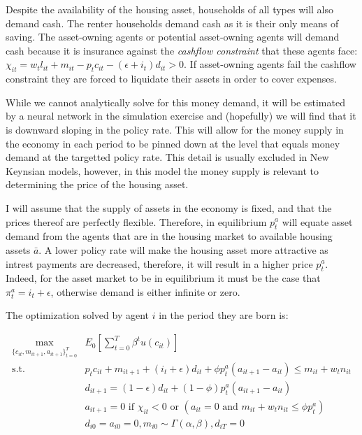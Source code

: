 \documentclass{article}
\begin{document}
Despite the availability of the housing asset, households of all types will also demand cash. The renter households demand cash as it is their only means of saving. The asset-owning agents or potential asset-owning agents will demand cash because it is insurance against the \textit{cashflow constraint} that these agents face: $\chi_{it} = w_t l_{it} + m_{it} - p_t c_{it} - (\epsilon + i_t) d_{it} > 0$. If asset-owning agents fail the cashflow constraint they are forced to liquidate their assets in order to cover expenses. 

While we cannot analytically solve for this money demand, it will be estimated by a neural network in the simulation exercise and (hopefully) we will find that it is downward sloping in the policy rate. This will allow for the money supply in the economy in each period to be pinned down at the level that equals money demand at the targetted policy rate. This detail is usually excluded in New Keynsian models, however, in this model the money supply is relevant to determining the price of the housing asset.

I will assume that the supply of assets in the economy is fixed, and that the prices thereof are perfectly flexible. Therefore, in equilibrium $p^a_t$ will equate asset demand from the agents that are in the housing market to available housing assets $\bar{a}$. A lower policy rate will make the housing asset more attractive as intrest payments are decreased, therefore, it will result in a higher price $p^a_t$. Indeed, for the asset market to be in equilibrium it must be the case that $\pi^a_t = i_t + \epsilon$, otherwise demand is either infinite or zero.

The optimization solved by agent $i$ in the period they are born is:

\begin{align}
  \underset{\{c_{it}, m_{it+1}, a_{it+1}\}_{t=0}^T}{\max} &E_0\left[\sum^T_{t=0} \beta^t u(c_{it}) \right] \nonumber \\
  \text{s.t. }&p_t c_{it} + m_{it+1} + (i_t + \epsilon) d_{it} + \phi p^a_t (a_{it+1} - a_{it}) \leq m_{it} + w_t n_{it} \nonumber \\
  &d_{it+1} = (1 - \epsilon) d_{it} + (1 - \phi) p^a_t (a_{it+1} - a_{it}) \nonumber \\
  &a_{it+1} = 0 \text{ if } \chi_{it} < 0 \text{ or } (a_{it} = 0 \text{ and } m_{it} + w_t n_{it} \leq \phi p^a_t) \nonumber \\
  &d_{i0} = a_{i0} = 0, m_{i0} \sim \Gamma(\alpha, \beta), d_{iT} = 0
\end{align}
\end{document}
